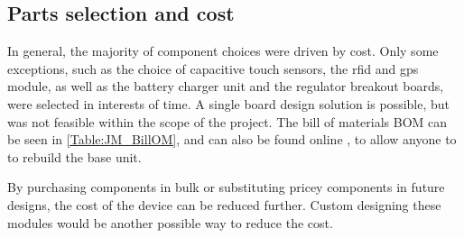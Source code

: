 \subsection{Parts selection and cost} 

In general, the majority of component choices were driven by cost. Only some exceptions, such as the choice of capacitive touch sensors, the \gls{rfid} and \gls{gps} module, as well as the battery charger unit and the regulator breakout boards, were selected in interests of time. A single board design solution is possible, but was not feasible within the scope of the project. The bill of materials \gls{BOM} can be seen in \cref{Table:JM_BillOM}, and can also be found online \cite{JM_BOM}, to allow anyone to to rebuild the base unit.

By purchasing components in bulk or substituting pricey components in future designs, the cost of the device can be reduced further. Custom designing these modules would be another possible way to reduce the cost.

